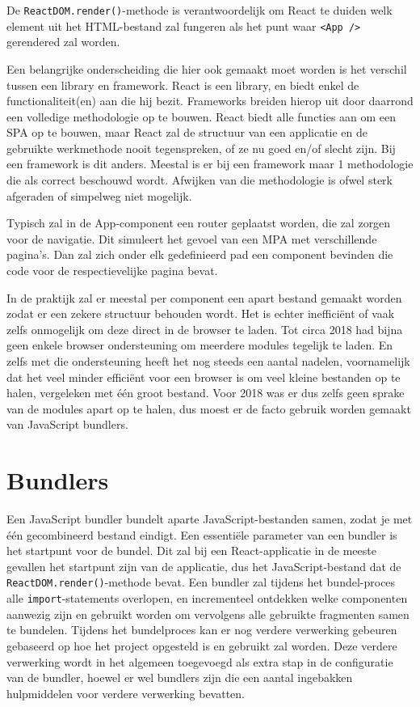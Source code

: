De \lstinline{ReactDOM.render()}-methode is verantwoordelijk om React te duiden welk element uit het HTML-bestand zal fungeren als het punt waar \lstinline{<App />} gerendered zal worden.

Een belangrijke onderscheiding die hier ook gemaakt moet worden is het verschil tussen een library en framework. React is een library, en biedt enkel de functionaliteit(en) aan die hij bezit. Frameworks breiden hierop uit door daarrond een volledige methodologie op te bouwen. React biedt alle functies aan om een SPA op te bouwen, maar React zal de structuur van een applicatie en de gebruikte werkmethode nooit tegenspreken, of ze nu goed en/of slecht zijn. Bij een framework is dit anders. Meestal is er bij een framework maar 1 methodologie die als correct beschouwd wordt. Afwijken van die methodologie is ofwel sterk afgeraden of simpelweg niet mogelijk. \autocite{roy_2022}

Typisch zal in de App-component een router geplaatst worden, die zal zorgen voor de navigatie. Dit simuleert het gevoel van een MPA met verschillende pagina's. Dan zal zich onder elk gedefinieerd pad een component bevinden die code voor de respectievelijke pagina bevat.

In de praktijk zal er meestal per component een apart bestand gemaakt worden zodat er een zekere structuur behouden wordt. Het is echter inefficiënt of vaak zelfs onmogelijk om deze direct in de browser te laden. Tot circa 2018 had bijna geen enkele browser ondersteuning om meerdere modules tegelijk te laden. En zelfs met die ondersteuning heeft het nog steeds een aantal nadelen, voornamelijk dat het veel minder efficiënt voor een browser is om veel kleine bestanden op te halen, vergeleken met één groot bestand. Voor 2018 was er dus zelfs geen sprake van de modules apart op te halen, dus moest er de facto gebruik worden gemaakt van JavaScript bundlers. \autocite{deveria_esmodules}

\section{Bundlers}

Een JavaScript bundler bundelt aparte JavaScript-bestanden samen, zodat je met één gecombineerd bestand eindigt. Een essentiële parameter van een bundler is het startpunt voor de bundel. Dit zal bij een React-applicatie in de meeste gevallen het startpunt zijn van de applicatie, dus het JavaScript-bestand dat de \lstinline{ReactDOM.render()}-methode bevat. Een bundler zal tijdens het bundel-proces alle \lstinline{import}-statements overlopen, en incrementeel ontdekken welke componenten aanwezig zijn en gebruikt worden om vervolgens alle gebruikte fragmenten samen te bundelen. Tijdens het bundelproces kan er nog verdere verwerking gebeuren gebaseerd op hoe het project opgesteld is en gebruikt zal worden. Deze verdere verwerking wordt in het algemeen toegevoegd als extra stap in de configuratie van de bundler, hoewel er wel bundlers zijn die een aantal ingebakken hulpmiddelen voor verdere verwerking bevatten.

